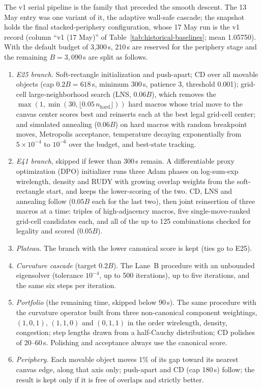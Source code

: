 The v1 serial pipeline is the family that preceded the smooth descent. The 13 May
entry was one variant of it, the adaptive wall-safe cascade; the snapshot holds the
final stacked-periphery configuration, whose 17 May run is the v1 record (column ``v1 (17 May)''
of Table~\ref{tab:historical-baselines}; mean 1.05750). With the default
budget of 3,300\,s, 210\,s are reserved for the periphery stage and the remaining
$B=3{,}090\,$s are split as follows.
\begin{enumerate}
  \item \emph{E25 branch.} Soft-rectangle initialization and push-apart; CD over all
        movable objects (cap $0.2B=618\,$s, minimum 300\,s, patience 3, threshold
        0.001); grid-cell large-neighborhood search (LNS, $0.06B$), which removes the
        $\max(1,\min(30,\lfloor0.05\,n_{\mathrm{hard}}\rfloor))$ hard macros whose
        trial move to the canvas center scores best and reinserts each at the
        best legal grid-cell center; and simulated annealing \citep{kirkpatrick1983sa}
($0.06B$) on hard
        macros with random breakpoint moves, Metropolis acceptance, temperature
        decaying exponentially from $5\times10^{-4}$ to $10^{-6}$ over the budget, and
        best-state tracking.
  \item \emph{E41 branch}, skipped if fewer than 300\,s remain. A differentiable
        proxy optimization (DPO) initializer runs three Adam phases on log-sum-exp
        wirelength, density and RUDY with growing overlap weights from the
        soft-rectangle start, and keeps the lower-scoring of the two. CD, LNS and
        annealing follow ($0.05B$ each for the last two), then joint reinsertion of
        three macros at a time: triples of high-adjacency macros, five
        single-move-ranked grid-cell candidates each, and all of the up to 125
        combinations checked for legality and scored ($0.05B$).
  \item \emph{Plateau.} The branch with the lower canonical score is kept (ties go
        to E25).
  \item \emph{Curvature cascade} (target $0.2B$). The Lane~B procedure with an
        unbounded eigensolver (tolerance $10^{-4}$, up to 500 iterations), up to
        five iterations, and the same six steps per iteration.
  \item \emph{Portfolio} (the remaining time, skipped below 90\,s). The same
        procedure with the curvature operator built from three non-canonical
        component weightings, $(1,0,1)$, $(1,1,0)$ and $(0,1,1)$ in the order
        wirelength, density, congestion; step lengths drawn from a half-Cauchy
        distribution; CD polishes of 20--60\,s. Polishing and acceptance always use
        the canonical score.
  \item \emph{Periphery.} Each movable object moves 1\% of its gap toward its
        nearest canvas edge, along that axis only; push-apart and CD (cap 180\,s)
        follow; the result is kept only if it is free of overlaps and strictly
        better.
\end{enumerate}
